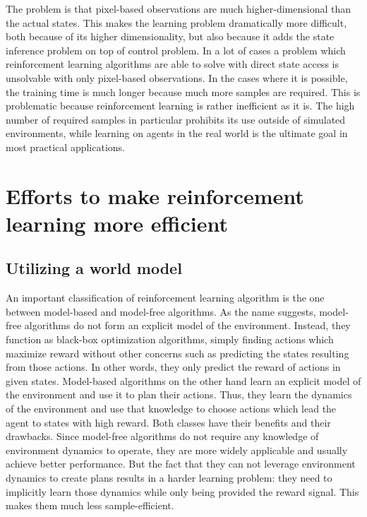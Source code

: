 The problem is that pixel-based observations are much higher-dimensional than
the actual states.
This makes the learning problem dramatically more difficult, both because
of its higher dimensionality, but also because it adds the state inference problem
on top of control problem.
In a lot of cases a problem which reinforcement learning algorithms are able 
to solve with direct state access is unsolvable with only pixel-based observations. 
In the cases where it is possible, the training time is much longer because much
more samples are required.
This is problematic because reinforcement learning is rather inefficient as it is.
The high number of required samples in particular prohibits its use
outside of simulated environments, while learning on agents in the real world
is the ultimate goal in most practical applications.

\section{Efforts to make reinforcement learning more efficient}
\label{efforts-in-making-rl-efficient}
\subsection{Utilizing a world model}
An important classification of reinforcement learning algorithm is the one between
model-based and model-free algorithms.
As the name suggests, model-free algorithms do not form an explicit model of the environment.
Instead, they function as black-box optimization algorithms, simply finding actions which maximize
reward without other concerns such as predicting the states resulting from those actions.
In other words, they only predict the reward of actions in given states.
Model-based algorithms on the other hand learn an explicit model of the environment
and use it to plan their actions.
Thus, they learn the dynamics of the environment and use that knowledge to choose actions
which lead the agent to states with high reward.
Both classes have their benefits and their drawbacks.
Since model-free algorithms do not require any knowledge of environment dynamics
to operate, they are more widely applicable and usually achieve better performance.
But the fact that they can not leverage environment dynamics to create plans results in  
a harder learning problem: they need to implicitly learn those dynamics
while only being provided the reward signal. 
This makes them much less sample-efficient.\\

